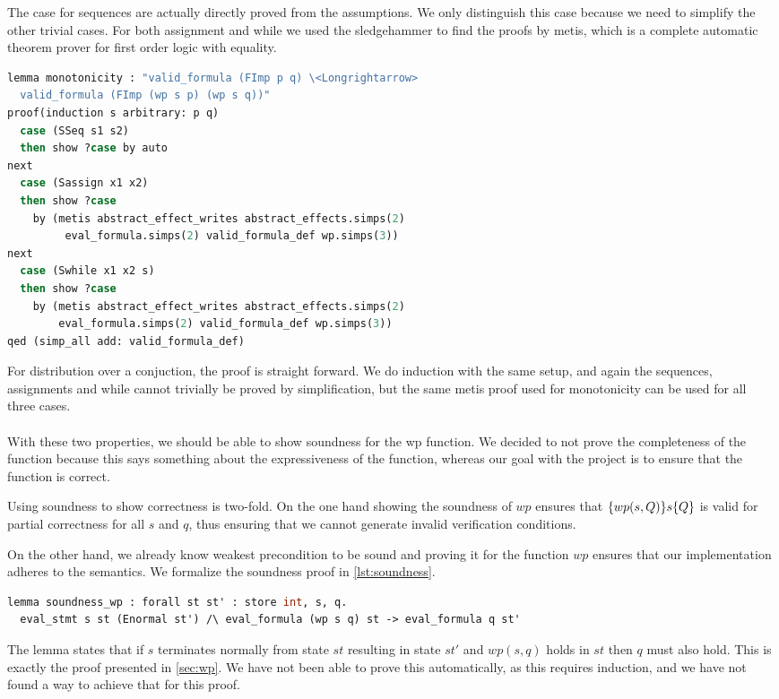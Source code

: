 The case for sequences are actually directly proved from the assumptions.
We only distinguish this case because we need to simplify the other trivial cases.
For both assignment and while we used the sledgehammer to find the proofs by metis,
which is a complete automatic theorem prover for first order logic with equality\cite{sledgehammer}.

\begin{lstlisting}[caption={Proof of monotonicity in Isabelle},label={lst:isamono},language=sml]
lemma monotonicity : "valid_formula (FImp p q) \<Longrightarrow>
  valid_formula (FImp (wp s p) (wp s q))"
proof(induction s arbitrary: p q)
  case (SSeq s1 s2)
  then show ?case by auto
next
  case (Sassign x1 x2)
  then show ?case
    by (metis abstract_effect_writes abstract_effects.simps(2)
         eval_formula.simps(2) valid_formula_def wp.simps(3))
next
  case (Swhile x1 x2 s)
  then show ?case
    by (metis abstract_effect_writes abstract_effects.simps(2)
        eval_formula.simps(2) valid_formula_def wp.simps(3))
qed (simp_all add: valid_formula_def)
\end{lstlisting}

For distribution over a conjuction, the proof is straight forward.
We do induction with the same setup,
and again the sequences, assignments and while cannot trivially be proved by simplification,
but the same metis proof used for monotonicity can be used for all three cases.
\\~\\
With these two properties, we should be able to show soundness for the wp function.
We decided to not prove the completeness of the function because this says something about the expressiveness of the function, whereas our goal with the project is to ensure that
the function is correct.

Using soundness to show correctness is two-fold.
On the one hand showing the soundness of $wp$ ensures that $\{wp(s,Q)\}s\{Q\}$ is valid for
partial correctness for all $s$ and $q$, thus ensuring that we cannot generate invalid verification conditions.

On the other hand, we already know weakest precondition to be sound and proving it for the
function $wp$ ensures that our implementation adheres to the semantics.
We formalize the soundness proof in \autoref{lst:soundness}.

\begin{lstlisting}[caption={WLP soundness lemma in Why3},label={lst:soundness},language=sml]
  lemma soundness_wp : forall st st' : store int, s, q.
  eval_stmt s st (Enormal st') /\ eval_formula (wp s q) st -> eval_formula q st'
\end{lstlisting}

The lemma states that if $s$ terminates normally from state $st$ resulting in state $st'$ and $wp(s,q)$ holds in $st$ then $q$ must also hold.
This is exactly the proof presented in \ref{sec:wp}.
We have not been able to prove this automatically, as this requires induction, and we have
not found a way to achieve that for this proof.
